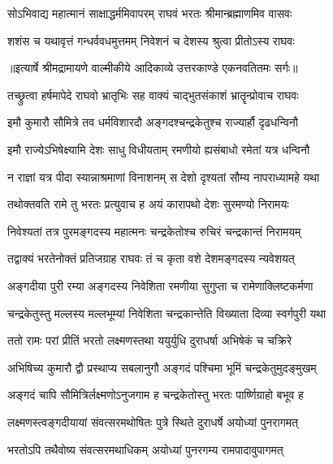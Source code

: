 \twolineshloka
{सोऽभिवाद्य महात्मानं साक्षाद्धर्ममिवापरम्}
{राघवं भरतः श्रीमान्ब्रह्माणमिव वासवः} %

\twolineshloka
{शशंस च यथावृत्तं गन्धर्ववधमुत्तमम्}
{निवेशनं च देशस्य श्रुत्वा प्रीतोऽस्य राघवः} %


{॥इत्यार्षे श्रीमद्रामायणे वाल्मीकीये आदिकाव्ये उत्तरकाण्डे एकनवतितमः सर्गः॥}


\twolineshloka
{तच्छ्रुत्वा हर्षमापेदे राघवो भ्रातृभिः सह}
{वाक्यं चाद्भुतसंकाशं भ्रातॄन्प्रोवाच राघवः} %

\twolineshloka
{इमौ कुमारौ सौमित्रे तव धर्मविशारदौ}
{अङ्गदश्चन्द्रकेतुश्च राज्यार्हौ दृढधन्विनौ} %

\twolineshloka
{इमौ राज्येऽभिषेक्ष्यामि देशः साधु विधीयताम्}
{रमणीयो ह्यसंबाधो रमेतां यत्र धन्विनौ} %

\twolineshloka
{न राज्ञां यत्र पीदा स्यान्नाश्रमाणां विनाशनम्}
{स देशो दृश्यतां सौम्य नापराध्यामहे यथा} %

\twolineshloka
{तथोक्तवति रामे तु भरतः प्रत्युवाच ह}
{अयं कारापथो देशः सुरमण्यो निरामयः} %

\twolineshloka
{निवेश्यतां तत्र पुरमङ्गदस्य महात्मनः}
{चन्द्रकेतोश्च रुचिरं चन्द्रकान्तं निरामयम्} %

\twolineshloka
{तद्वाक्यं भरतेनोक्तं प्रतिजग्राह राघवः}
{तं च कृता वशे देशमङ्गदस्य न्यवेशयत्} %

\twolineshloka
{अङ्गदीया पुरी रम्या अङ्गदस्य निवेशिता}
{रमणीया सुगुप्ता च रामेणाक्लिष्टकर्मणा} %

\twolineshloka
{चन्द्रकेतुस्तु मल्लस्य मल्लभूम्यां निवेशिता}
{चन्द्रकान्तेति विख्याता दिव्या स्वर्गपुरी यथा} %

\twolineshloka
{ततो रामः परां प्रीतिं भरतो लक्ष्मणस्तथा}
{ययुर्युधि दुराधर्षा अभिषेकं च चक्रिरे} %

\twolineshloka
{अभिषिच्य कुमारौ द्वौ प्रस्थाप्य सबलानुगौ}
{अङ्गदं पश्चिमा भूमिं चन्द्रकेतुमुदङ्मुखम्} %

\twolineshloka
{अङ्गदं चापि सौमित्रिर्लक्ष्मणोऽनुजगाम ह}
{चन्द्रकेतोस्तु भरतः पार्ष्णिग्राहो बभूव ह} %

\twolineshloka
{लक्ष्मणस्त्वङ्गदीयायां संवत्सरमथोषितः}
{पुत्रे स्थिते दुराधर्षे अयोध्यां पुनरागमत्} %

\twolineshloka
{भरतोऽपि तथैवोष्य संवत्सरमथाधिकम्}
{अयोध्यां पुनरगम्य रामपादावुपागमत्} %


